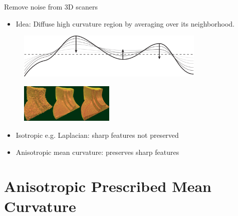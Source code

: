 \documentclass{beamer}
\begin{document}
\begin{frame}{Remove noise from 3D scaners}{}
\begin{itemize}
\item Idea: Diffuse high curvature region by averaging over its neighborhood.
\end{itemize}
\begin{figure}[htb]
\centering
\includegraphics[width=0.8\textwidth]{ddg_heat_equation.png}
\label{fig:diffuse}
\end{figure}
\begin{figure}[htb]
\centering
\includegraphics[width=0.4\textwidth]{motivation.PNG}
\label{fig:motivation}
\end{figure}
\begin{itemize}
\item Isotropic e.g. Laplacian: sharp features not preserved
\item Anisotropic mean curvature: preserves sharp features
\end{itemize}
\end{frame}

\section{Anisotropic Prescribed Mean Curvature}
\end{document}
